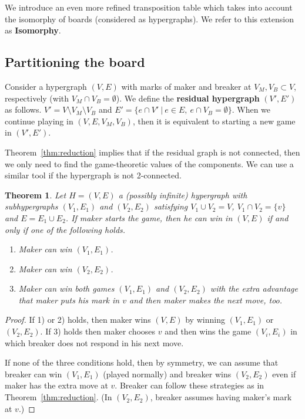 \documentclass[conference]{IEEEtran}
\newtheorem{theorem}{Theorem}[section]
\theoremstyle{definition}
\begin{document}
We introduce an even more refined transposition table which takes into account the isomorphy of boards (considered as hypergraphs). We refer to this extension as {\bf Isomorphy}.

\subsection{Partitioning the board}

Consider a hypergraph $(V, E)$ with marks of maker and breaker at $V_M, V_B \subset V$, respectively (with $V_M \cap V_B = \emptyset$). We define the {\bf residual hypergraph} $(V', E')$ as follows. $V' = V \setminus V_M \setminus V_B$ and $E' = \big\{ e \cap V' \ |\ e \in E,\ e \cap V_B = \emptyset \big\}$. When we continue playing in $(V, E, V_M, V_B)$, then it is equivalent to starting a new game in $(V', E')$.

Theorem~\ref{thm:reduction} implies that if the residual graph is not connected, then we only need to find the game-theoretic values of the components. We can use a similar tool if the hypergraph is not 2-connected.  
\begin{theorem}
\label{thm:2-connected}
Let $H = (V, E)$ a (possibly infinite) hypergraph with subhypergraphs $(V_1, E_1)$ and $(V_2, E_2)$ satisfying $V_1 \cup V_2 = V$, $V_1 \cap V_2 = \{v\}$ and $E = E_1 \cup E_2$. If maker starts the game, then he can win in $(V, E)$ if and only if one of the following holds.
\begin{enumerate}
    \item Maker can win $(V_1, E_1)$.
    \item Maker can win $(V_2, E_2)$.
    \item Maker can win both games $(V_1, E_1)$ and $(V_2, E_2)$ with the extra advantage that maker puts his mark in $v$ and then maker makes the next move, too.
\end{enumerate}
\end{theorem}

\begin{proof}
If 1) or 2) holds, then maker wins $(V, E)$ by winning $(V_1, E_1)$ or $(V_2, E_2)$. If 3) holds then maker chooses $v$ and then wins the game $(V_i, E_i)$ in which breaker does not respond in his next move.

If none of the three conditions hold, then by symmetry, we can assume that breaker can win $(V_1, E_1)$ (played normally) and breaker wins $(V_2, E_2)$ even if maker has the extra move at $v$. Breaker can follow these strategies as in Theorem~\ref{thm:reduction}. (In $(V_2, E_2)$, breaker assumes having maker's mark at $v$.)
\end{proof}
\end{document}
